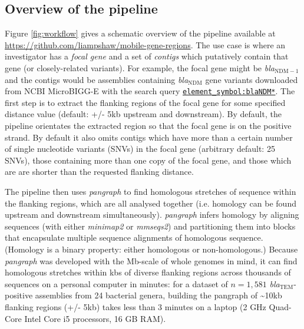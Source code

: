 \documentclass[rmp,superscriptaddress,11pt]{revtex4-1}
\newcommand{\bla}[1]{\textit{bla}$_\mathrm{#1}$}
\begin{document}
\subsection*{Overview of the pipeline}

\noindent Figure \ref{fig:workflow} gives a schematic overview of the pipeline available at \href{https://github.com/liampshaw/mobile-gene-regions}{https://github.com/liampshaw/mobile-gene-regions}. The use case is where an investigator has a \textit{focal gene} and a set of \textit{contigs} which putatively contain that gene (or closely-related variants). For example, the focal gene might be \bla{NDM-1} and the contigs would be assemblies containing \bla{NDM} gene variants downloaded from NCBI MicroBIGG-E with the search query \href{https://www.ncbi.nlm.nih.gov/pathogens/microbigge/#element_symbol:blaNDM*}{\texttt{element\_symbol:blaNDM*}}. The first step is to extract the flanking regions of the focal gene for some specified distance value (default: +/- 5kb upstream and downstream). By default, the pipeline orientates the extracted region so that the focal gene is on the positive strand. By default it also omits contigs which have more than a certain number of single nucleotide variants (SNVs) in the focal gene (arbitrary default: 25 SNVs), those containing more than one copy of the focal gene, and those which are are shorter than the requested flanking distance. 

The pipeline then uses \textit{pangraph} \cite{Noll2023} to find homologous stretches of sequence within the flanking regions, which are all analysed together (i.e. homology can be found upstream and downstream simultaneously). \textit{pangraph} infers homology by aligning sequences (with either \textit{minimap2} or \textit{mmseqs2}) and partitioning them into blocks that encapsulate multiple sequence alignments of homologous sequence. (Homology is a binary property: either homologous or non-homologous.) Because \textit{pangraph} was developed with the Mb-scale of whole genomes in mind, it can find homologous stretches within kbs of diverse flanking regions across thousands of sequences on a personal computer in minutes: for a dataset of $n=1,581$ \bla{TEM}-positive assemblies from 24 bacterial genera, building the pangraph of \textasciitilde10kb flanking regions (+/- 5kb) takes less than 3 minutes on a laptop (2 GHz Quad-Core Intel Core i5 processors, 16 GB RAM). \par
\end{document}
